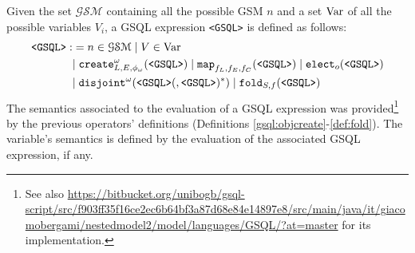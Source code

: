 \begin{definition}
Given the set  $\mathcal{GSM}$ containing all the possible GSM $n$ and a set $\textup{Var}$ of all the possible variables $V_i$, a GSQL expression \texttt{<GSQL>} is defined as follows:
\[\begin{split}
\texttt{<GSQL>}:&=n\in\mathcal{GSM}\;|\;V\in\textup{Var}\\
	&|\;\texttt{create}^\omega_{L,E,\phi_\omega}(\texttt{<GSQL>})\;|\;\texttt{map}_{f_L,f_E,f_C}(\texttt{<GSQL>})\;|\;\texttt{elect}_o(\texttt{<GSQL>})\\
	&|\;\texttt{disjoint}^\omega(\texttt{<GSQL>}(,\texttt{<GSQL>})^*)\;|\;\texttt{fold}_{S,f}(\texttt{<GSQL>})\\
\end{split}\]
The semantics associated to the evaluation of a GSQL expression was provided\footnote{See also \url{https://bitbucket.org/unibogb/gsql-script/src/f903ff35f16ce2ec6b64bf3a87d68e84e14897e8/src/main/java/it/giacomobergami/nestedmodel2/model/languages/GSQL/?at=master} for its implementation.} by the previous operators' definitions (Definitions \ref{gsql:objcreate}-\ref{def:fold}). The variable's semantics is defined by the evaluation of the associated GSQL expression, if any.
\end{definition}
